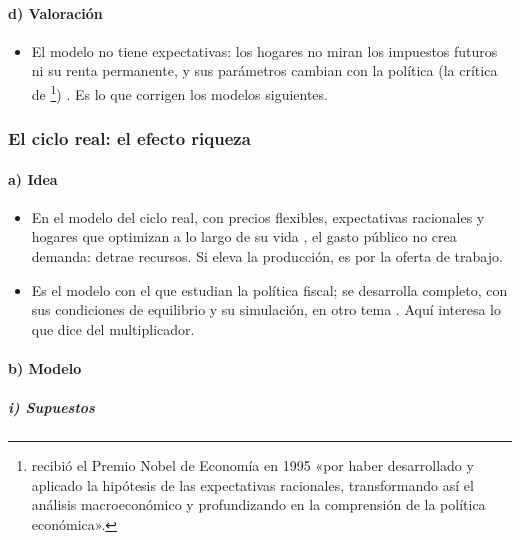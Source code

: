 \documentclass[11pt]{article}
\begin{document}
\paragraph{d) Valoración}

\begin{itemize}
\item El modelo no tiene expectativas: los hogares no miran los impuestos futuros ni su renta permanente, y sus parámetros cambian con la política (la crítica de \footnote{ recibió el Premio Nobel de Economía en 1995 «por haber desarrollado y aplicado la hipótesis de las expectativas racionales, transformando así el análisis macroeconómico y profundizando en la comprensión de la política económica»\nocite{NobelPrize1995Lucas}.}) . Es lo que corrigen los modelos siguientes.
\end{itemize}

\subsubsection{El ciclo real: el efecto riqueza}\label{sec:ciclo-real}

\paragraph{a) Idea}

\begin{itemize}
\item En el modelo del ciclo real, con precios flexibles, expectativas racionales y hogares que optimizan a lo largo de su vida , el gasto público no crea demanda: detrae recursos. Si eleva la producción, es por la oferta de trabajo.
\item Es el modelo con el que \textcite{BaxterKing1993Fiscal} estudian la política fiscal; se desarrolla completo, con sus condiciones de equilibrio y su simulación, en otro tema . Aquí interesa lo que dice del multiplicador.
\end{itemize}

\paragraph{b) Modelo}

\subparagraph{i) Supuestos}
\end{document}
